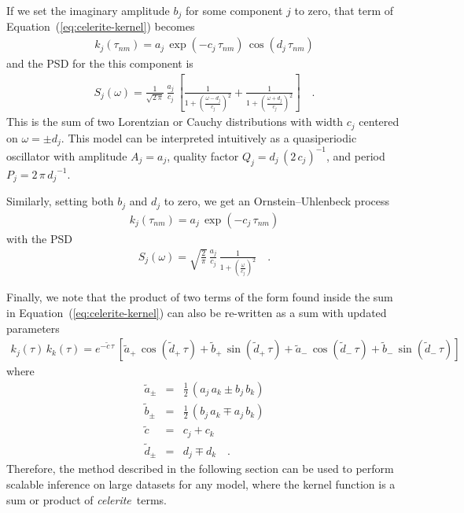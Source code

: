 \documentclass[manuscript, letterpaper]{aastex6}
\newcommand{\celeriteterm}{\emph{celerite}}
\renewcommand{\eqref}[1]{\ref{eq:#1}}
\newcommand{\Eq}[1]{Equation~(\eqref{#1})}
\newcommand{\eq}[1]{\Eq{#1}}
\newcommand{\eqlabel}[1]{\label{eq:#1}}
\begin{document}
If we set the imaginary amplitude $b_j$ for some component $j$ to zero, that
term of \eq{celerite-kernel} becomes
\begin{eqnarray}
k_j(\tau_{nm}) =
    a_j\,\exp\left(-c_j\,\tau_{nm}\right)\,\cos\left(d_j\,\tau_{nm}\right)
\end{eqnarray}
and the PSD for the this component is
\begin{eqnarray}\eqlabel{lorentz-psd}
S_j(\omega) = \frac{1}{\sqrt{2\,\pi}}\,\frac{a_j}{c_j}\,\left[
    \frac{1}{1+{\left(\frac{\omega-d_j}{c_j}\right)}^2} +
    \frac{1}{1+{\left(\frac{\omega+d_j}{c_j}\right)}^2}
\right] \quad.
\end{eqnarray}
This is the sum of two Lorentzian or Cauchy distributions with width $c_j$
centered on $\omega = \pm d_j$.
This model can be interpreted intuitively as a quasiperiodic oscillator with
amplitude $A_j = a_j$, quality factor $Q_j = d_j\,{(2\,c_j)}^{-1}$, and period
$P_j = 2\,\pi\,{d_j}^{-1}$.

Similarly, setting both $b_j$ and $d_j$ to zero, we get an Ornstein--Uhlenbeck
process
\begin{eqnarray}
k_j(\tau_{nm}) = a_j\,\exp\left(-c_j\,\tau_{nm}\right)
\end{eqnarray}
with the PSD
\begin{eqnarray}
S_j(\omega) = \sqrt{\frac{2}{\pi}}\,\frac{a_j}{c_j}\,
    \frac{1}{1+{\left(\frac{\omega}{c_j}\right)}^2} \quad.
\end{eqnarray}

Finally, we note that the product of two terms of the form found inside the
sum in \eq{celerite-kernel} can also be re-written as a sum with updated
parameters
\begin{eqnarray}\eqlabel{product-rule}
k_j(\tau) \, k_k(\tau) =
    e^{-\tilde{c}\,\tau}\,[
        \tilde{a}_+\,\cos(\tilde{d}_+\,\tau) + \tilde{b}_+\,\sin(\tilde{d}_+\,\tau) +
        \tilde{a}_-\,\cos(\tilde{d}_-\,\tau) + \tilde{b}_-\,\sin(\tilde{d}_-\,\tau)
    ]
\end{eqnarray}
where
\begin{eqnarray}
    \tilde{a}_{\pm} &=& \frac{1}{2}\,(a_j\,a_k \pm b_j\,b_k) \\
    \tilde{b}_{\pm} &=& \frac{1}{2}\,(b_j\,a_k \mp a_j\,b_k) \\
    \tilde{c} &=& c_j + c_k \\
    \tilde{d}_{\pm} &=& d_j \mp d_k \quad.
\end{eqnarray}
Therefore, the method described in the following section can be used to
perform scalable inference on large datasets for any model, where the kernel
function is a sum or product of \celeriteterm\ terms.
\end{document}
